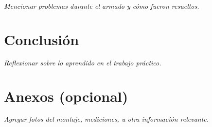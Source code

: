 \documentclass[12pt,a4paper]{article}
\begin{document}
\textit{Mencionar problemas durante el armado y cómo fueron resueltos.}

\section{Conclusión}

\textit{Reflexionar sobre lo aprendido en el trabajo práctico.}

\section{Anexos (opcional)}

\textit{Agregar fotos del montaje, mediciones, u otra información relevante.}

\end{document}
